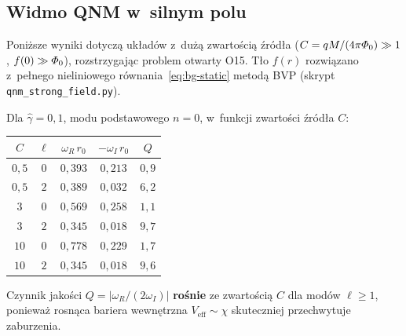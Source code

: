 \subsection{Widmo QNM w~silnym polu}\label{ssec:qnm-strong}

Poni\.zsze wyniki dotycz\k{a} uk\l{}ad\'ow z~du\.z\k{a}
zwarto\'sci\k{a} \'zr\'od\l{}a ($C = qM/(4\pi\varPhi_0) \gg 1$,
$f(0) \gg \varPhi_0$), rozstrzygaj\k{a}c problem otwarty O15.
T\l{}o $f(r)$ rozwi\k{a}zano z~pe\l{}nego nieliniowego
r\'ownania~\eqref{eq:bg-static} metod\k{a} BVP
(skrypt \texttt{qnm\_strong\_field.py}).

\begin{proposition}[Widmo silnego pola: $\ell = 0{,}1{,}2{,}3$]%
\label{prop:qnm-strong}
Dla $\hat\gamma = 0{,}1$, modu podstawowego $n = 0$,
w~funkcji zwarto\'sci \'zr\'od\l{}a $C$:
\begin{center}
\begin{tabular}{ccccc}
\toprule
$C$ & $\ell$ & $\omega_R\,r_0$ & $-\omega_I\,r_0$ & $Q$ \\
\midrule
$0{,}5$ & $0$ & $0{,}393$ & $0{,}213$ & $0{,}9$ \\
$0{,}5$ & $2$ & $0{,}389$ & $0{,}032$ & $6{,}2$ \\
$3$ & $0$ & $0{,}569$ & $0{,}258$ & $1{,}1$ \\
$3$ & $2$ & $0{,}345$ & $0{,}018$ & $9{,}7$ \\
$10$ & $0$ & $0{,}778$ & $0{,}229$ & $1{,}7$ \\
$10$ & $2$ & $0{,}345$ & $0{,}018$ & $9{,}6$ \\
\bottomrule
\end{tabular}
\end{center}
Czynnik jako\'sci $Q = |\omega_R/(2\omega_I)|$ \textbf{ro\'snie}
ze zwarto\'sci\k{a} $C$ dla mod\'ow $\ell \geq 1$, poniewa\.z
rosn\k{a}ca bariera wewn\k{e}trzna $V_{\mathrm{eff}} \sim \chi$
skuteczniej przechwytuje zaburzenia.
\end{proposition}

